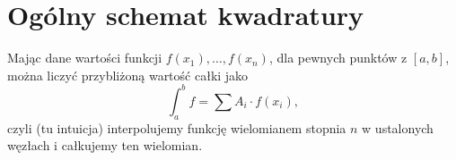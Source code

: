 \section{Ogólny schemat kwadratury}
Mając dane wartości funkcji \( f(x_1), \dots, f(x_n) \), dla pewnych punktów z \( [a, b] \), można liczyć przybliżoną wartość całki jako
\[
	\int_{a}^{b} f = \sum A_i \cdot f(x_i),
\]
czyli (tu intuicja) interpolujemy funkcję wielomianem stopnia \( n \) w ustalonych węzłach i całkujemy ten wielomian.
